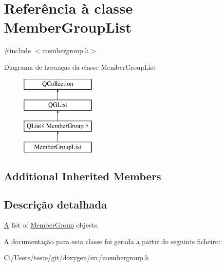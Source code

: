 \hypertarget{class_member_group_list}{\section{Referência à classe Member\-Group\-List}
\label{class_member_group_list}
}


{\ttfamily \#include $<$membergroup.\-h$>$}

Diagrama de heranças da classe Member\-Group\-List\begin{figure}[H]
\begin{center}
\leavevmode
\includegraphics[height=4.000000cm]{class_member_group_list}
\end{center}
\end{figure}
\subsection*{Additional Inherited Members}


\subsection{Descrição detalhada}
\hyperlink{class_a}{A} list of \hyperlink{class_member_group}{Member\-Group} objects. 

A documentação para esta classe foi gerada a partir do seguinte ficheiro\-:\begin{DoxyCompactItemize}
\item 
C\-:/\-Users/teste/git/doxygen/src/membergroup.\-h\end{DoxyCompactItemize}
